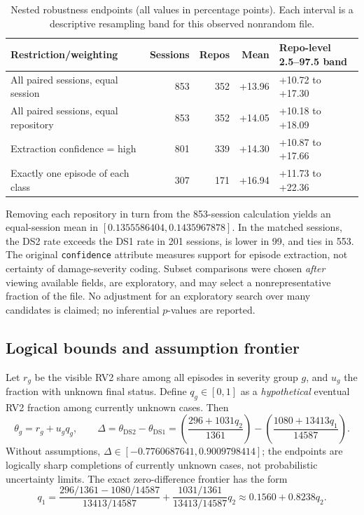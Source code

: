 \begin{table}[h!]
\centering\small
\caption{Nested robustness endpoints (all values in percentage points). Each interval is a descriptive resampling band for this observed nonrandom file.}
\label{tab:appendix-robustness}
\begin{tabularx}{\linewidth}{@{}YrrrY@{}}
\toprule
Restriction/weighting & Sessions & Repos & Mean & Repo-level 2.5--97.5 band\\\midrule
All paired sessions, equal session & 853 & 352 & +13.96 & +10.72 to +17.30\\
All paired sessions, equal repository & 853 & 352 & +14.05 & +10.18 to +18.09\\
Extraction confidence = high & 801 & 339 & +14.30 & +10.87 to +17.66\\
Exactly one episode of each class & 307 & 171 & +16.94 & +11.73 to +22.36\\
\bottomrule
\end{tabularx}
\end{table}

Removing each repository in turn from the 853-session calculation yields an equal-session mean in $[0.1355586404,0.1435967878]$. In the matched sessions, the DS2 rate exceeds the DS1 rate in 201 sessions, is lower in 99, and ties in 553. The original \texttt{confidence} attribute measures support for episode extraction, not certainty of damage-severity coding. Subset comparisons were chosen \emph{after} viewing available fields, are exploratory, and may select a nonrepresentative fraction of the file. No adjustment for an exploratory search over many candidates is claimed; no inferential $p$-values are reported.

\subsection{Logical bounds and assumption frontier}\label{app:bounds}
Let $r_g$ be the visible RV2 share among all episodes in severity group $g$, and $u_g$ the fraction with unknown final status. Define $q_g\in[0,1]$ as a \emph{hypothetical} eventual RV2 fraction among currently unknown cases. Then
\[
\theta_g=r_g+u_gq_g,\qquad
\Delta=\theta_{\mathrm{DS2}}-\theta_{\mathrm{DS1}}=
\left(\frac{296+1031q_2}{1361}\right)-\left(\frac{1080+13413q_1}{14587}\right).
\]
Without assumptions, $\Delta\in[-0.7760687641,0.9009798414]$; the endpoints are logically sharp completions of currently unknown cases, not probabilistic uncertainty limits. The exact zero-difference frontier has the form
\[
q_1=\frac{296/1361-1080/14587}{13413/14587}+\frac{1031/1361}{13413/14587}q_2\approx0.1560+0.8238q_2.
\]

